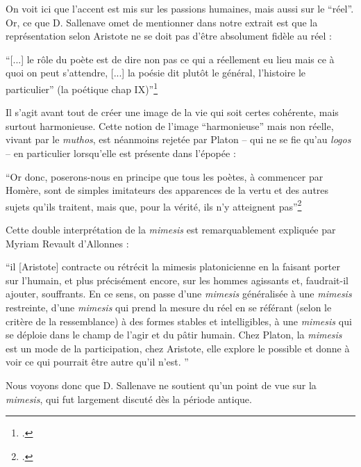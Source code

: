 \documentclass[a4paper,10pt]{article}
\begin{document}
				On voit ici que l'accent est mis sur les passions humaines, mais aussi sur le ``réel''.\\
				Or, ce que D. Sallenave omet de mentionner dans notre extrait est que la représentation selon Aristote ne se doit pas d'être absolument fidèle au réel :
				\begin{center}
					\footnotesize
					\begin{minipage}{0.7\textwidth}
						``[...] le rôle du poète est de dire non pas ce qui a réellement eu lieu mais ce à quoi on peut s’attendre, [...]  la poésie dit plutôt le général, l’histoire le particulier'' (la poétique chap IX)''\footcite[chap.~IX]{Aristote}
					\end{minipage}
				\end{center}
				Il s'agit avant tout de créer une image de la vie qui soit certes cohérente, mais surtout harmonieuse. Cette notion de l'image ``harmonieuse'' mais non réelle, vivant par le \textit{muthos}, est néanmoins rejetée par Platon -- qui ne se fie qu'au \textit{logos} -- en particulier lorsqu'elle est présente dans l'épopée :
				\begin{center}
					\footnotesize
					\begin{minipage}{0.7\textwidth}
						``Or donc, poserons-nous en principe que tous les poètes, à commencer par Homère, sont de simples imitateurs
						des apparences de la vertu et des autres sujets qu’ils traitent, mais que, pour la vérité, ils n’y atteignent pas''\footcite{Platon}
					\end{minipage}
				\end{center}
				Cette double interprétation de la \textit{mimesis} est remarquablement expliquée par Myriam Revault d'Allonnes\cite{Revault1992} :
				\begin{center}
					\footnotesize
					\begin{minipage}{0.7\textwidth}
						``il [Aristote] contracte ou rétrécit la mimesis platonicienne en la faisant porter sur l'humain, et plus précisément encore, sur les hommes agissants et, faudrait-il ajouter, souffrants. En ce sens, on passe d'une \textit{mimesis} généralisée à une \textit{mimesis} restreinte, d'une \textit{mimesis} qui prend la mesure du réel en se référant (selon le critère de la ressemblance) à des formes stables et intelligibles, à une \textit{mimesis} qui se déploie dans le champ de l'agir et du pâtir humain. Chez Platon, la \textit{mimesis} est un mode de la participation, chez Aristote,
						elle explore le possible et donne à voir ce qui pourrait être autre qu'il n'est. ''
					\end{minipage}
				\end{center}
				Nous voyons donc que D. Sallenave ne soutient qu'un point de vue sur la \textit{mimesis}, qui fut largement discuté dès la période antique.
				
\end{document}
